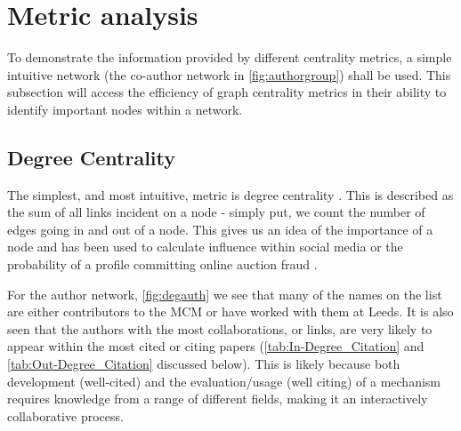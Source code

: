 

\section{Metric analysis}\label{sec:graphcentrality}

To demonstrate the information provided by different centrality metrics, a simple intuitive network (the co-author network in \autoref{fig:authorgroup}) shall be used. This subsection will access the efficiency of graph centrality metrics in their ability to identify important nodes within a network. 


\subsection{Degree Centrality}
The simplest, and most intuitive, metric is degree centrality \citep{degreefreeman}. This is described as the sum of all links incident on a node - simply put, we count the number of edges going in and out of a node. This gives us an idea of the importance of a node and has been used to calculate influence within social media or the probability of a profile committing online auction fraud \citep{degreetwitter,degreefreeman}.

For the author network, \autoref{fig:degauth} we see that many of the names on the list are either contributors to the MCM or have worked with them at Leeds. It is also seen that the authors with the most collaborations, or links, are very likely to appear within the most cited or citing papers (\autoref{tab:In-Degree_Citation} and \autoref{tab:Out-Degree_Citation} discussed below). This is likely because both development (well-cited) and the evaluation/usage (well citing) of a mechanism requires knowledge from a range of different fields, making it an interactively collaborative process. 

